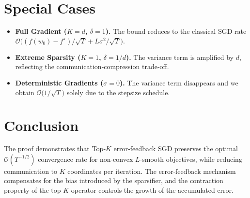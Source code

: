 \documentclass[11pt]{article}
\begin{document}
\section*{Special Cases}
\begin{itemize}
\item \textbf{Full Gradient ($K=d$, $\delta=1$).} The bound reduces to the classical SGD rate $\mathcal O\bigl((f(w_0)-f^{\star})/\sqrt{T}+L\sigma^{2}/\sqrt{T}\bigr)$.
\item \textbf{Extreme Sparsity ($K=1$, $\delta=1/d$).} The variance term is amplified by $d$, reflecting the communication‑compression trade‑off.
\item \textbf{Deterministic Gradients ($\sigma=0$).} The variance term disappears and we obtain $\mathcal O\bigl(1/\sqrt{T}\bigr)$ solely due to the stepsize schedule.
\end{itemize}

\section*{Conclusion}
The proof demonstrates that Top‑$K$ error‑feedback SGD preserves the optimal $\mathcal O(T^{-1/2})$ convergence rate for non‑convex $L$‑smooth objectives, while reducing communication to $K$ coordinates per iteration. The error‑feedback mechanism compensates for the bias introduced by the sparsifier, and the contraction property of the top‑$K$ operator controls the growth of the accumulated error.
\end{document}
